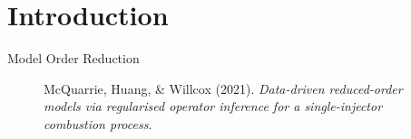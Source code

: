 \section{Introduction}
\label{sec:intro}

\begin{frame}{Model Order Reduction}
  \begin{figure}
    \centering
    \caption*{\tiny McQuarrie, Huang, \& Willcox (2021). \textit{Data-driven reduced-order models via regularised operator inference for a single-injector combustion process}.}
  \end{figure}

\end{frame}

